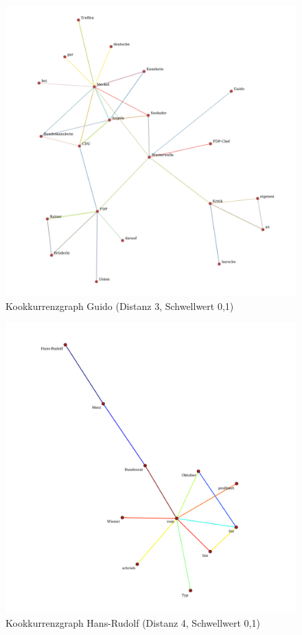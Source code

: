 \documentclass[11pt, a4paper]{article}
\begin{document}
\begin{figure}[hp!]
    \centering
        \includegraphics[scale=.4]{../../data/results/longpath_wordgraphs/den/graph_Guido.pdf}
    \caption{Kookkurrenzgraph Guido (Distanz 3, Schwellwert 0,1)}
    \label{fig:lp-guido}
\end{figure}

\begin{figure}[hp!]
    \centering
        \includegraphics[scale=.4]{../../data/results/longpath_wordgraphs/den/graph_HansRudolf.pdf}
    \caption{Kookkurrenzgraph Hans-Rudolf (Distanz 4, Schwellwert 0,1)}
    \label{fig:lp-hansrudolf}
\end{figure}
\end{document}
